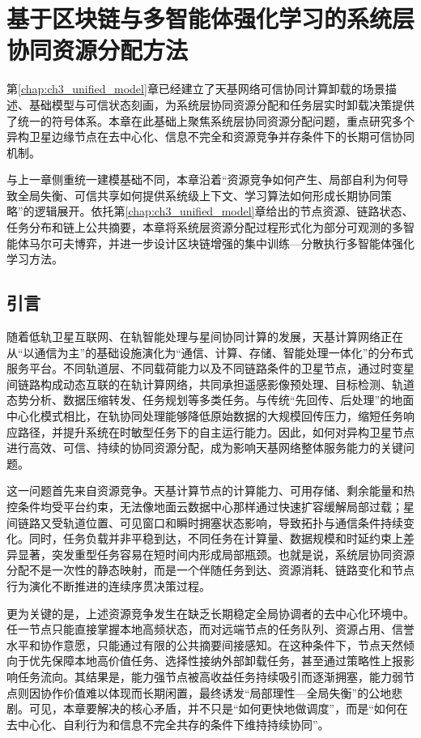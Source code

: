 \chapter{基于区块链与多智能体强化学习的系统层协同资源分配方法}
\label{chap:ch4_system_resource_allocation}

第\ref{chap:ch3_unified_model}章已经建立了天基网络可信协同计算卸载的场景描述、基础模型与可信状态刻画，为系统层协同资源分配和任务层实时卸载决策提供了统一的符号体系。本章在此基础上聚焦系统层协同资源分配问题，重点研究多个异构卫星边缘节点在去中心化、信息不完全和资源竞争并存条件下的长期可信协同机制。

与上一章侧重统一建模基础不同，本章沿着“资源竞争如何产生、局部自利为何导致全局失衡、可信共享如何提供系统级上下文、学习算法如何形成长期协同策略”的逻辑展开。依托第\ref{chap:ch3_unified_model}章给出的节点资源、链路状态、任务分布和链上公共摘要，本章将系统层资源分配过程形式化为部分可观测的多智能体马尔可夫博弈，并进一步设计区块链增强的集中训练—分散执行多智能体强化学习方法。


\section{引言}

随着低轨卫星互联网、在轨智能处理与星间协同计算的发展，天基计算网络正在从“以通信为主”的基础设施演化为“通信、计算、存储、智能处理一体化”的分布式服务平台。不同轨道层、不同载荷能力以及不同链路条件的卫星节点，通过时变星间链路构成动态互联的在轨计算网络，共同承担遥感影像预处理、目标检测、轨道态势分析、数据压缩转发、任务规划等多类任务。与传统“先回传、后处理”的地面中心化模式相比，在轨协同处理能够降低原始数据的大规模回传压力，缩短任务响应路径，并提升系统在时敏型任务下的自主运行能力。因此，如何对异构卫星节点进行高效、可信、持续的协同资源分配，成为影响天基网络整体服务能力的关键问题。

这一问题首先来自资源竞争。天基计算节点的计算能力、可用存储、剩余能量和热控条件均受平台约束，无法像地面云数据中心那样通过快速扩容缓解局部过载；星间链路又受轨道位置、可见窗口和瞬时拥塞状态影响，导致拓扑与通信条件持续变化。同时，任务负载并非平稳到达，不同任务在计算量、数据规模和时延约束上差异显著，突发重型任务容易在短时间内形成局部瓶颈。也就是说，系统层协同资源分配不是一次性的静态映射，而是一个伴随任务到达、资源消耗、链路变化和节点行为演化不断推进的连续序贯决策过程。

更为关键的是，上述资源竞争发生在缺乏长期稳定全局协调者的去中心化环境中。任一节点只能直接掌握本地高频状态，而对远端节点的任务队列、资源占用、信誉水平和协作意愿，只能通过有限的公共摘要间接感知。在这种条件下，节点天然倾向于优先保障本地高价值任务、选择性接纳外部卸载任务，甚至通过策略性上报影响任务流向。其结果是，能力强节点被高收益任务持续吸引而逐渐拥塞，能力弱节点则因协作价值难以体现而长期闲置，最终诱发“局部理性—全局失衡”的公地悲剧。可见，本章要解决的核心矛盾，并不只是“如何更快地做调度”，而是“如何在去中心化、自利行为和信息不完全共存的条件下维持持续协同”。

